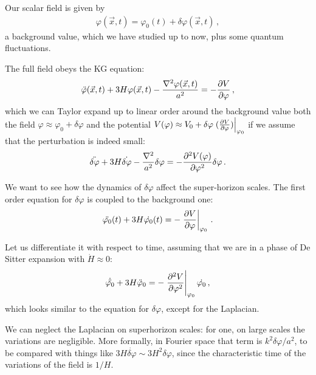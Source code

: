 \documentclass[main.tex]{subfiles}
\begin{document}

Our scalar field is given by 
%
\begin{align}
\varphi (\vec{x}, t) = \varphi_0 (t) + \delta \varphi (\vec{x}, t)
\,,
\end{align}
%
a background value, which we have studied up to now, plus some quantum fluctuations. 

The full field obeys the KG equation: 
%
\begin{align}
\ddot{\varphi}(\vec{x}, t) + 3 H \varphi (\vec{x}, t)
- \frac{\nabla^2 \varphi (\vec{x}, t)}{a^2} 
= - \pdv{V}{\varphi }
\,,
\end{align}
%
which we can Taylor expand up to linear order around the background value both the field \(\varphi \approx \varphi_0 + \delta \varphi \) and the potential \(V(\varphi ) \approx V_0 + \delta \varphi \eval{(\pdv{V}{\varphi })}_{\varphi_0 }\) if we assume that the perturbation is indeed small: 
%
\begin{align}
\ddot{ \delta \varphi} + 3 H \dot{\delta \varphi}
- \frac{\nabla^2}{a^2} \delta \varphi 
= - \pdv[2]{V(\varphi )}{\varphi } \delta \varphi 
\,.
\end{align}

We want to see how the dynamics of \(\delta \varphi \) affect the super-horizon scales. 
The first order equation for \(\delta \varphi \) is coupled to the background one: 
%
\begin{align}
\ddot{\varphi_0} (t) + 3 H \dot{\varphi_0 } (t) = - \eval{\pdv{V}{\varphi }}_{\varphi_0 }
\,.
\end{align}

Let us differentiate it with respect to time, assuming that we are in a phase of De Sitter expansion with \(\dot{H} \approx 0 \): 
%
\begin{align}
\dot{\ddot{\varphi_0}} + 3 H \ddot{\varphi} _0
= - \eval{\pdv[2]{V}{\varphi }}_{\varphi_0 } \dot{\varphi_0 }
\,,
\end{align}
%
which looks similar to the equation for \(\delta \varphi \), except for the Laplacian. 

We can neglect the Laplacian on superhorizon scales: for one, on large scales the variations are negligible. More formally, in Fourier space that term is \(k^2 \delta \varphi / a^2\), to be compared with things like \(3 H \dot{ \delta  \varphi} \sim 3 H^2 \delta \varphi \), since the characteristic time of the variations of the field is \(1/H\).  
\end{document}
